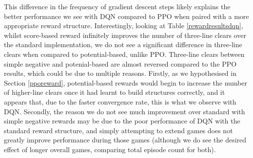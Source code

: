 \documentclass[12pt]{article}
\begin{document}
This difference in the frequency of gradient descent steps likely explains the better performance we see with DQN compared to PPO when paired with a more appropriate reward structure. Interestingly, looking at Table \ref{rewardresultsdqn}, whilst score-based reward infinitely improves the number of three-line clears over the standard implementation, we do not see a significant difference in three-line clears when compared to potential-based, unlike PPO. Three-line clears between simple negative and potenial-based are almost reversed compared to the PPO results, which could be due to multiple reasons. Firstly, as we hypothesised in Section \ref{pporeward}, potential-based rewards would begin to increase the number of higher-line clears once it had learnt to build structures correctly, and it appears that, due to the faster convergence rate, this is what we observe with DQN. Secondly, the reason we do not see much improvement over standard with simple negative rewards may be due to the poor performance of DQN with the standard reward structure, and simply attempting to extend games does not greatly improve performance during those games (although we do see the desired effect of longer overall games, comparing total episode count for both).
\begin{table}[H]
    \centering
      \caption{\label{rewardresultsdqn} Counts for different types of clears over the course of training for different reward structures.}
\end{table}
\end{document}

